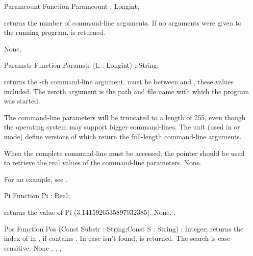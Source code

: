 
\begin{function}{Paramcount}
\Declaration
Function Paramcount  : Longint;

\Description
{} returns the number of command-line arguments. If no
arguments were given to the running program,  is returned.

\Errors
None.
\SeeAlso
{}
\end{function}


\begin{function}{Paramstr}
\Declaration
Function Paramstr (L : Longint) : String;

\Description
{} returns the -th command-line argument.  must
be between  and , these values included.
The zeroth argument is the path and file name with which the program was
started.

The command-line parameters will be truncated to a length of 255,
even though the operating system may support bigger command-lines.
The  unit (used in  or  mode) define versions
of  which return the full-length command-line arguments.

When the complete command-line must be accessed, the  pointer
should be used to retrieve the real values of the command-line parameters.
\Errors
None.
\SeeAlso
{}
\end{function}
For an example, see .
\begin{function}{Pi}
\Declaration
Function Pi  : Real;

\Description
{} returns the value of Pi (3.1415926535897932385).
\Errors
None.
\SeeAlso
{}, 
\end{function}


\begin{function}{Pos}
\Declaration
Function Pos (Const Substr : String;Const S : String) : Integer;
\Description
{} returns the index of  in , if  contains
. In case  isn't found,  is returned.
The search is case-sensitive.
\Errors
None
\SeeAlso
{}, , , 
\end{function}


